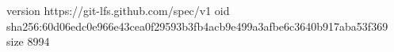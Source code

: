 version https://git-lfs.github.com/spec/v1
oid sha256:60d06edc0e966e43cea0f29593b3fb4acb9e499a3afbe6c3640b917aba53f369
size 8994
